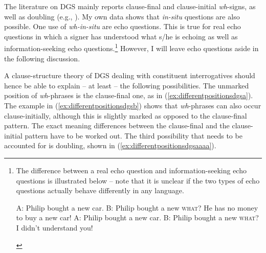 The literature on DGS mainly reports clause-final and clause-initial \textit{wh}-signs, as well as doubling (e.g., \citealt{papaspyrou2008grammatik, happ2014vork}). My own data shows that \textit{in-situ} questions are also possible. One use of \textit{wh-in-situ} are echo questions. This is true for real echo questions in which a signer has understood what s/he is echoing as well as information-seeking echo questions.\footnote{ The difference between a real echo question and information-seeking echo questions is illustrated below -- note that it is unclear if the two types of echo questions actually behave differently in any language.

\begin{exe}
\ex\label{echoquestionillustrationenglish}\begin{xlist}
\ex A: Philip bought a new car.
\glt B: Philip bought a new \textsc{what}? He has no money to buy a new car! \label{echoquestionillustrationenglishb}
\ex A: Philip bought a new car.
\glt B: Philip bought a new \textsc{what}? I didn't understand you! \label{echoquestionillustrationenglisha}

\end{xlist}
\end{exe}

} However, I will leave echo questions aside in the following discussion.

A clause-structure theory of DGS dealing with constituent interrogatives should hence be able to explain -- at least -- the following possibilities. The unmarked position of \textit{wh}-phrases is the clause-final one, as in (\ref{ex:differentpositionsdgsa}). The example in (\ref{ex:differentpositionsdgsb}) shows that \textit{wh}-phrases can also occur clause-initially, although this is slightly marked as opposed to the clause-final pattern. The exact meaning differences between the clause-final and the clause-initial pattern have to be worked out. The third possibility that needs to be accounted for is doubling, shown in (\ref{ex:differentpositionsdgsaaaa}). 

